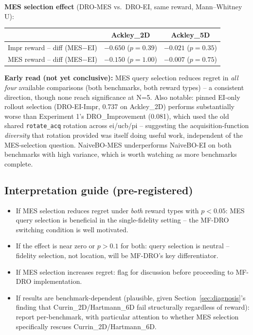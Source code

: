 \documentclass[11pt]{article}
\begin{document}
\textbf{MES selection effect} (DRO-MES vs.\ DRO-EI, same reward, Mann--Whitney U):
\begin{center}
\begin{tabular}{lcc}
\toprule
& \textbf{Ackley\_2D} & \textbf{Ackley\_5D} \\
\midrule
Impr reward -- diff (MES$-$EI) & $-0.650$ ($p=0.39$) & $-0.021$ ($p=0.35$) \\
MES reward -- diff (MES$-$EI)  & $-0.150$ ($p=1.00$) & $-0.007$ ($p=0.75$) \\
\bottomrule
\end{tabular}
\end{center}

\textbf{Early read (not yet conclusive):} MES query selection reduces regret
in \emph{all four} available comparisons (both benchmarks, both reward types)
-- a consistent direction, though none reach significance at N=5. Also notable:
pinned EI-only rollout selection (DRO-EI-Impr, 0.737 on Ackley\_2D) performs
substantially worse than Experiment 1's DRO\_Improvement (0.081), which used
the old shared \texttt{rotate\_acq} rotation across ei/ucb/pi -- suggesting the
acquisition-function \emph{diversity} that rotation provided was itself doing
useful work, independent of the MES-selection question. NaiveBO-MES
underperforms NaiveBO-EI on both benchmarks with high variance, which is
worth watching as more benchmarks complete.

\subsection{Interpretation guide (pre-registered)}

\begin{itemize}[itemsep=3pt]
    \item If MES selection reduces regret under \emph{both} reward types with
          $p<0.05$: MES query selection is beneficial in the single-fidelity
          setting -- the MF-DRO switching condition is well motivated.
    \item If the effect is near zero or $p>0.1$ for both: query selection is
          neutral -- fidelity selection, not location, will be MF-DRO's key
          differentiator.
    \item If MES selection increases regret: flag for discussion before
          proceeding to MF-DRO implementation.
    \item If results are benchmark-dependent (plausible, given Section~\ref{sec:diagnosis}'s
          finding that Currin\_2D/Hartmann\_6D fail structurally regardless of
          reward): report per-benchmark, with particular attention to whether
          MES selection specifically rescues Currin\_2D/Hartmann\_6D.
\end{itemize}
\end{document}
